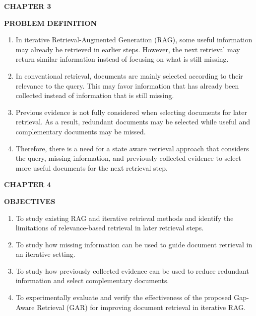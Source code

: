 \documentclass[12pt,a4paper]{report}
\newcommand{\chaptertitle}[2]{
    \begin{center}
        {\fontsize{18}{21}\selectfont\bfseries CHAPTER #1\par}
        \vspace{0.10in}
        {\fontsize{18}{21}\selectfont\bfseries #2\par}
    \end{center}
    \vspace{0.12in}
}
\begin{document}



\chaptertitle{3}{PROBLEM DEFINITION}
\justifying

\begin{enumerate}[leftmargin=0.30in,itemsep=0.12in,parsep=0pt]

\item
In iterative Retrieval-Augmented Generation (RAG), some useful information may already be retrieved in earlier steps. However, the next retrieval may return similar information instead of focusing on what is still missing.

\item
In conventional retrieval, documents are mainly selected according to their relevance to the query. This may favor information that has already been collected instead of information that is still missing.

\item
Previous evidence is not fully considered when selecting documents for later retrieval. As a result, redundant documents may be selected while useful and complementary documents may be missed.

\item
Therefore, there is a need for a state aware retrieval approach that considers the query, missing information, and previously collected evidence to select more useful documents for the next retrieval step.

\end{enumerate}
\clearpage





\chaptertitle{4}{OBJECTIVES}

\begin{enumerate}[leftmargin=0.30in,itemsep=0.12in,parsep=0pt]

\item
To study existing RAG and iterative retrieval methods and identify the limitations of relevance-based retrieval in later retrieval steps.

\item
To study how missing information can be used to guide document retrieval in an iterative setting.

\item
To study how previously collected evidence can be used to reduce redundant information and select complementary documents.

\item
To experimentally evaluate and verify the effectiveness of the proposed Gap-Aware Retrieval (GAR) for improving document retrieval in iterative RAG.

\end{enumerate}
\clearpage
\end{document}
